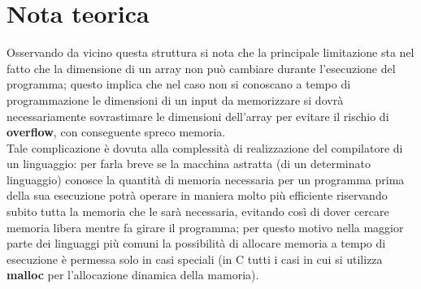 \section{Nota teorica}
Osservando da vicino questa struttura si nota che la principale limitazione sta nel fatto che la dimensione di un array non può cambiare durante l'esecuzione del programma; questo implica che nel caso non si conoscano a tempo di programmazione le dimensioni di un input da memorizzare si dovrà necessariamente sovrastimare le dimensioni dell'array per evitare il rischio di \textbf{overflow}, con conseguente spreco memoria.\\ 
Tale complicazione è dovuta alla complessità di realizzazione del compilatore di un linguaggio: per farla breve se la macchina astratta (di un determinato linguaggio) conosce la quantità di memoria necessaria per un programma prima della sua esecuzione 
potrà operare in maniera molto più efficiente riservando subito tutta la memoria che le sarà necessaria, evitando così di dover cercare memoria libera mentre fa girare il programma; per questo motivo nella maggior parte dei linguaggi più comuni la possibilità di allocare memoria a tempo di esecuzione è permessa solo in casi speciali (in C tutti i casi in cui si utilizza \textbf{malloc} per l'allocazione dinamica della mamoria).\\



